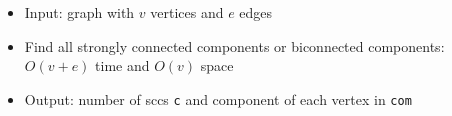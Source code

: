 \begin{itemize}
	\item Input: graph with $v$ vertices and $e$ edges
	\item Find all strongly connected components or biconnected components: $O(v+e)$ time and $O(v)$ space
	\item Output: number of sccs \lstinline{c} and component of each vertex in \lstinline{com}
\end{itemize}
